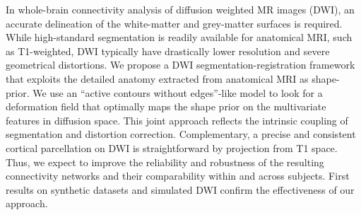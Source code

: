 In whole-brain connectivity analysis of diffusion weighted MR images (DWI),
an accurate delineation of the white-matter and grey-matter surfaces is required.
While high-standard segmentation is readily available for anatomical MRI, such 
as T1-weighted, DWI typically have drastically lower resolution and severe 
geometrical distortions. We propose a DWI segmentation-registration framework 
that exploits the detailed anatomy extracted from anatomical MRI as shape-prior.
We use an ``active contours without edges''-like model to look for a deformation
field that optimally maps the shape prior on the multivariate features 
in diffusion space. This joint approach reflects the intrinsic coupling of 
segmentation and distortion correction. Complementary, a precise and consistent
cortical parcellation on DWI is straightforward by projection from T1 space. Thus,
we expect to improve the reliability and robustness of the resulting connectivity 
networks and their comparability within and across subjects. First results 
on synthetic datasets and simulated DWI confirm the effectiveness of our approach.